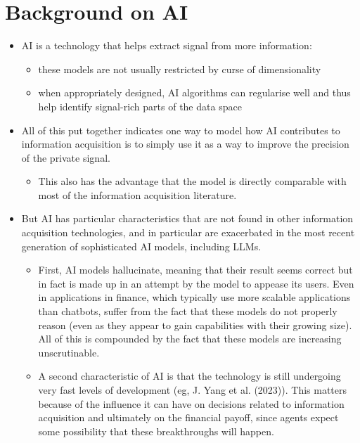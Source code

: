 \documentclass[
]{article}
\providecommand{\tightlist}{%
  \setlength{\itemsep}{0pt}\setlength{\parskip}{0pt}}\usepackage{longtable,booktabs,array}
\theoremstyle{plain}
\theoremstyle{definition}
\theoremstyle{remark}
\begin{document}
\section{Background on AI}\label{background-on-ai}

\begin{itemize}
\tightlist
\item
  AI is a technology that helps extract signal from more information:

  \begin{itemize}
  \tightlist
  \item
    these models are not usually restricted by curse of dimensionality
  \item
    when appropriately designed, AI algorithms can regularise well and
    thus help identify signal-rich parts of the data space
  \end{itemize}
\item
  All of this put together indicates one way to model how AI contributes
  to information acquisition is to simply use it as a way to improve the
  precision of the private signal.

  \begin{itemize}
  \tightlist
  \item
    This also has the advantage that the model is directly comparable
    with most of the information acquisition literature.
  \end{itemize}
\item
  But AI has particular characteristics that are not found in other
  information acquisition technologies, and in particular are
  exacerbated in the most recent generation of sophisticated AI models,
  including LLMs.

  \begin{itemize}
  \tightlist
  \item
    First, AI models hallucinate, meaning that their result seems
    correct but in fact is made up in an attempt by the model to appease
    its users. Even in applications in finance, which typically use more
    scalable applications than chatbots, suffer from the fact that these
    models do not properly reason (even as they appear to gain
    capabilities with their growing size). All of this is compounded by
    the fact that these models are increasing unscrutinable.
  \item
    A second characteristic of AI is that the technology is still
    undergoing very fast levels of development (eg, J. Yang et al.
    (2023)). This matters because of the influence it can have on
    decisions related to information acquisition and ultimately on the
    financial payoff, since agents expect some possibility that these
    breakthroughs will happen.
  \end{itemize}
\end{itemize}
\end{document}
